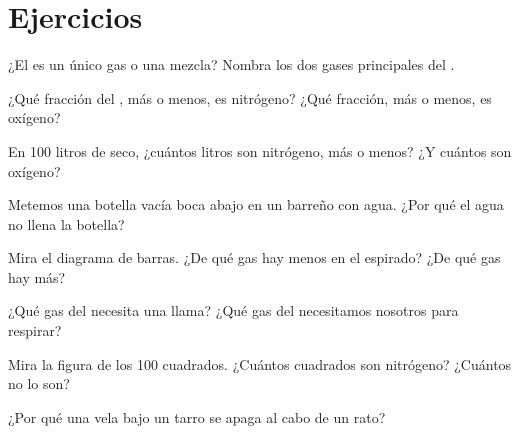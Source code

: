 \section{Ejercicios}

\begin{exercise}[$\star$]\label{exo:g4:air-a-mixture-of-gases:1}
¿El  es un único gas o una mezcla? Nombra los dos gases principales
del .
\end{exercise}

\begin{exercise}[$\star$]\label{exo:g4:air-a-mixture-of-gases:2}
¿Qué fracción del , más o menos, es nitrógeno? ¿Qué fracción, más o
menos, es oxígeno?
\end{exercise}

\begin{exercise}[$\star$]\label{exo:g4:air-a-mixture-of-gases:3}
En 100 litros de  seco, ¿cuántos litros son nitrógeno, más o menos?
¿Y cuántos son oxígeno?
\end{exercise}

\begin{exercise}[$\star$]\label{exo:g4:air-a-mixture-of-gases:4}
Metemos una botella vacía boca abajo en un barreño con agua. ¿Por qué
el agua no llena la botella?
\end{exercise}

\begin{exercise}[$\star$]\label{exo:g4:air-a-mixture-of-gases:5}
Mira el diagrama de barras. ¿De qué gas hay menos en el  espirado?
¿De qué gas hay más?
\end{exercise}

\begin{exercise}[$\star$]\label{exo:g4:air-a-mixture-of-gases:6}
¿Qué gas del  necesita una llama? ¿Qué gas del  necesitamos
nosotros para respirar?
\end{exercise}

\begin{exercise}[$\star$]\label{exo:g4:air-a-mixture-of-gases:7}
Mira la figura de los 100 cuadrados. ¿Cuántos cuadrados son nitrógeno?
¿Cuántos no lo son?
\end{exercise}

\begin{exercise}[$\star$]\label{exo:g4:air-a-mixture-of-gases:8}
¿Por qué una vela bajo un tarro se apaga al cabo de un rato?
\end{exercise}

